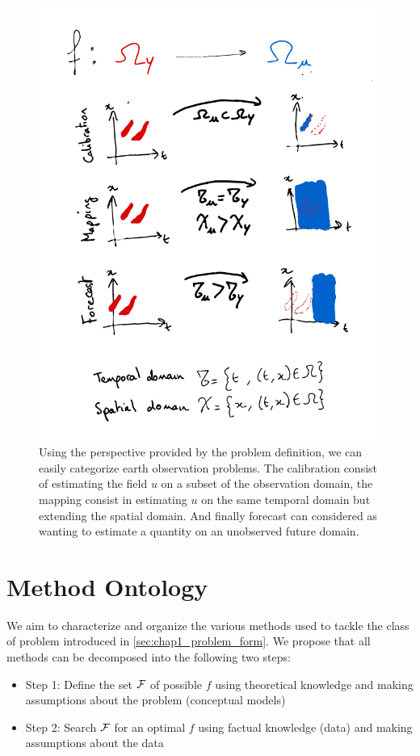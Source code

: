 \begin{bibunit}
{{{{{{\begin{figure}[htbp]
\begin{center}
\includegraphics[width=0.8\linewidth]{Chapitre1/Ch1-Figures/Task_ontology.png}
\end{center}
\caption[Task characterization through the domains $\Omega_u$ and $\Omega_y$ of $u$ and $y$]
{\footnotesize Using the perspective provided by the problem definition, we can easily categorize earth observation problems.
The calibration consist of estimating the field $u$ on a subset of the observation domain, the mapping consist in estimating $u$ on the same temporal domain but extending the spatial domain.
And finally forecast can considered as wanting to estimate a quantity on an unobserved future domain.}
\label{fig:task_ontology}
\end{figure}

\section{Method Ontology}
We aim to characterize and organize the various methods used to tackle the class of problem introduced in \ref{sec:chap1_problem_form}. We propose that all methods can be decomposed into the following two steps:
\begin{itemize}
\item Step 1: Define the set $\cal{F}$ of possible $f$ using theoretical knowledge and making assumptions about the problem (conceptual models)
\item Step 2: Search $\cal{F}$ for an optimal $f$ using factual knowledge (data) and making assumptions about the data
\end{itemize}

}}}}}}
\end{bibunit}
